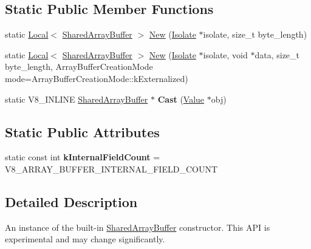 \subsection*{Static Public Member Functions}
\begin{DoxyCompactItemize}
\item 
static \hyperlink{classv8_1_1Local}{Local}$<$ \hyperlink{classv8_1_1SharedArrayBuffer}{Shared\+Array\+Buffer} $>$ \hyperlink{classv8_1_1SharedArrayBuffer_a0e7060cc31105c5bf780d770c1a7acc6}{New} (\hyperlink{classv8_1_1Isolate}{Isolate} $\ast$isolate, size\+\_\+t byte\+\_\+length)
\item 
static \hyperlink{classv8_1_1Local}{Local}$<$ \hyperlink{classv8_1_1SharedArrayBuffer}{Shared\+Array\+Buffer} $>$ \hyperlink{classv8_1_1SharedArrayBuffer_af708b1765380ad42b7d572dfc531c21c}{New} (\hyperlink{classv8_1_1Isolate}{Isolate} $\ast$isolate, void $\ast$data, size\+\_\+t byte\+\_\+length, Array\+Buffer\+Creation\+Mode mode=Array\+Buffer\+Creation\+Mode\+::k\+Externalized)
\item 
\hypertarget{classv8_1_1SharedArrayBuffer_ac4e1ba5d4564c7033814f4cc45fdda84}{}static V8\+\_\+\+I\+N\+L\+I\+N\+E \hyperlink{classv8_1_1SharedArrayBuffer}{Shared\+Array\+Buffer} $\ast$ {\bfseries Cast} (\hyperlink{classv8_1_1Value}{Value} $\ast$obj)\label{classv8_1_1SharedArrayBuffer_ac4e1ba5d4564c7033814f4cc45fdda84}

\end{DoxyCompactItemize}
\subsection*{Static Public Attributes}
\begin{DoxyCompactItemize}
\item 
\hypertarget{classv8_1_1SharedArrayBuffer_a6f47f6b441e37aefd1a9d0176e8a3da8}{}static const int {\bfseries k\+Internal\+Field\+Count} = V8\+\_\+\+A\+R\+R\+A\+Y\+\_\+\+B\+U\+F\+F\+E\+R\+\_\+\+I\+N\+T\+E\+R\+N\+A\+L\+\_\+\+F\+I\+E\+L\+D\+\_\+\+C\+O\+U\+N\+T\label{classv8_1_1SharedArrayBuffer_a6f47f6b441e37aefd1a9d0176e8a3da8}

\end{DoxyCompactItemize}


\subsection{Detailed Description}
An instance of the built-\/in \hyperlink{classv8_1_1SharedArrayBuffer}{Shared\+Array\+Buffer} constructor. This A\+P\+I is experimental and may change significantly. 

